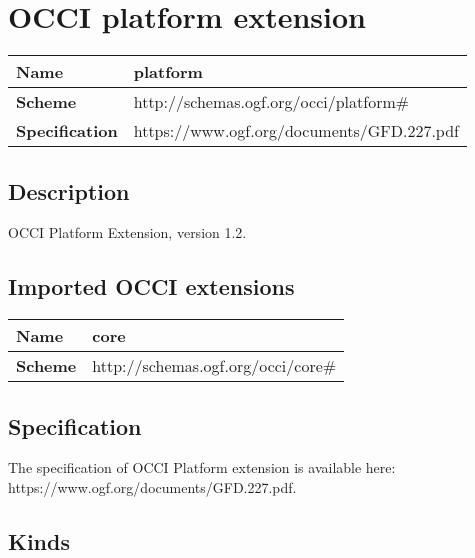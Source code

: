 \section{OCCI platform extension}
\begin{center}
\begin{tabular}{|l|l|}
  \hline
  \textbf{Name} & platform \\
  \hline  
  \textbf{Scheme} & http://schemas.ogf.org/occi/platform\# \\
  \hline
  \textbf{Specification} & https://www.ogf.org/documents/GFD.227.pdf \\
  \hline
\end{tabular}
\end{center}

\subsection{Description}
OCCI Platform Extension, version 1.2.
\subsection{Imported OCCI extensions}

\begin{center} 
\begin{tabular}{|l|l|}
  \hline
  \textbf{Name} & core \\
  \hline  
  \textbf{Scheme} & http://schemas.ogf.org/occi/core\# \\
  \hline
\end{tabular}
\end{center}


\subsection{Specification}
The specification of OCCI Platform extension is available here: https://www.ogf.org/documents/GFD.227.pdf.
\subsection{Kinds}
